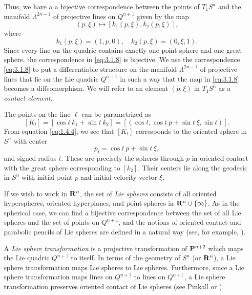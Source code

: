 \documentclass[12pt]{article}
\begin{document}
Thus, we have a  a bijective correspondence between the points of $T_1S^n$ and the
manifold  $\Lambda^{2n-1}$ of projective lines on $Q^{n+1}$ given by the map
\begin{equation}
\label{eq:3.1.8}
(p, \xi) \mapsto [k_1(p, \xi), k_2 (p, \xi)],
\end{equation}
where
\begin{equation}
\label{eq:3.1.9}
k_1(p, \xi) = (1,p,0), \quad k_2(p, \xi) = (0,\xi,1).
\end{equation}
Since every line on the quadric contains exactly one point sphere and one great sphere,
the correspondence in \eqref{eq:3.1.8} is bijective.  We use the
correspondence \eqref{eq:3.1.8} to put a differentiable structure on the manifold $\Lambda^{2n-1}$ of projective 
lines that lie on the Lie quadric $Q^{n+1}$
in such a way that
the map in \eqref{eq:3.1.8} becomes a diffeomorphism.
We will refer to an element $(p, \xi)$ in  $T_1S^n$ as a {\em contact element}.


The points on the line $\ell$ can be parametrized as
\begin{equation}
\label{eq:spheres-in-parabolic-pen} 
[K_t] = [\cos t \ k_1 + \sin t \ k_2] = [(\cos t, \cos t \ p + \sin t \ \xi, \sin t)].
\end{equation}
From equation \eqref{eq:1.4.4}, we see that $[K_t]$ corresponds to the oriented sphere in $S^n$ with center
\begin{equation}
\label{eq:1.5.4}
p_t = \cos t \ p + \sin t \ \xi,
\end{equation}  
and signed radius $t$.  
These are precisely the spheres through $p$ in oriented contact with the great sphere
corresponding to $[k_2]$.  Their centers lie along the geodesic in $S^n$ with initial point $p$ and initial velocity
vector $\xi$.  


If we wish to work in ${\bf R}^n$, the set of {\em Lie spheres} consists of all oriented hyperspheres, oriented hyperplanes, and point spheres in ${\bf R}^n \cup \{ \infty\}$.  As in the spherical case,
we can find a bijective correspondence between the set of all Lie spheres and the set of
points on $Q^{n+1}$, and the notions of oriented contact and parabolic pencils of
Lie spheres are defined in a natural way (see, 
for example, \cite[pp. 14--23]{Cec1}).


A {\em Lie sphere transformation} 
is a projective transformation of ${\bf P}^{n+2}$ which maps the Lie quadric $Q^{n+1}$
to itself.  In terms of the geometry of $S^n$ (or ${\bf R}^n$), 
a Lie sphere transformation maps Lie spheres to Lie spheres.
Furthermore, since a Lie sphere transformation maps lines on $Q^{n+1}$ to lines on $Q^{n+1}$, 
a Lie sphere transformation preserves oriented contact of Lie spheres  (see Pinkall \cite[p. 431]{P4}
or \cite[pp. 25--30]{Cec1}).
\end{document}
